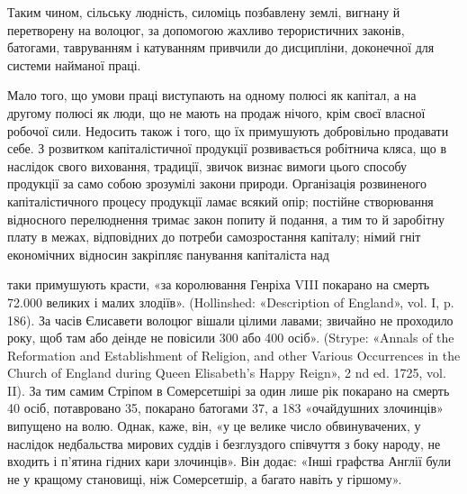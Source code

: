 Таким чином, сільську людність, силоміць позбавлену землі,
вигнану й перетворену на волоцюг, за допомогою жахливо терористичних
законів, батогами, тавруванням і катуванням привчили
до дисципліни, доконечної для системи найманої праці.

Мало того, що умови праці виступають на одному полюсі як
капітал, а на другому полюсі як люди, що не мають на продаж
нічого, крім своєї власної робочої сили. Недосить також і того,
що їх примушують добровільно продавати себе. З розвитком капіталістичної
продукції розвивається робітнича кляса, що в наслідок
свого виховання, традиції, звичок визнає вимоги цього способу
продукції за само собою зрозумілі закони природи. Організація
розвиненого капіталістичного процесу продукції ламає
всякий опір; постійне створювання відносного перелюднення
тримає закон попиту й подання, а тим то й заробітну плату
в межах, відповідних до потреби самозростання капіталу; німий
гніт економічних відносин закріпляє панування капіталіста над

таки примушують красти, «за королювання Генріха VIII покарано на
смерть 72.000 великих і малих злодіїв». (Hollinshed: «Description of
England», vol. I, p. 186). За часів Єлисавети волоцюг вішали цілими лавами;
звичайно не проходило року, щоб там або деінде не повісили 300
або 400 осіб». (Strype: «Annals of the Reformation and Establishment
of Religion, and other Various Occurrences in the Church of England
during Queen Elisabeth’s Happy Reign», 2 nd ed. 1725, vol. II). За тим самим
Стріпом в Сомерсетшірі за один лише рік покарано на смерть 40 осіб,
потавровано 35, покарано батогами 37, а 183 «очайдушних злочинців»
випущено на волю. Однак, каже, він, «у це велике число обвинувачених,
у наслідок недбальства мирових суддів і безглуздого співчуття
з боку народу, не входить і п’ятина гідних кари злочинців». Він додає:
«Інші графства Англії були не у кращому становищі, ніж Сомерсетшір,
а багато навіть у гіршому».
\parbreak{}  %

